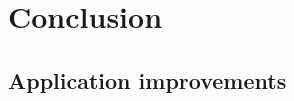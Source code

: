 \chapter{Conclusion}\label{sec:Conclusion}

\section{Application improvements}
\label{sec:ApplicationImprovements}